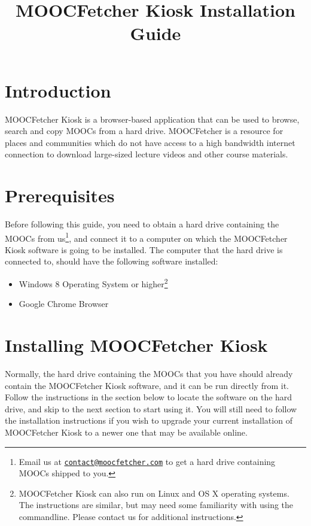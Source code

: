 \documentclass[]{article}
\title{MOOCFetcher Kiosk Installation Guide}
\date{}
\providecommand{\tightlist}{%
  \setlength{\itemsep}{0pt}\setlength{\parskip}{0pt}}
\begin{document}
\maketitle

\section{Introduction}\label{introduction}

MOOCFetcher Kiosk is a browser-based application that can be used to
browse, search and copy MOOCs from a hard drive. MOOCFetcher is a
resource for places and communities which do not have access to a high
bandwidth internet connection to download large-sized lecture videos and
other course materials.

\section{Prerequisites}\label{prerequisites}

Before following this guide, you need to obtain a hard drive containing
the MOOCs from us\footnote{Email us at
  \href{mailto:contact@moocfetcher.com}{\nolinkurl{contact@moocfetcher.com}}
  to get a hard drive containing MOOCs shipped to you.}, and connect it
to a computer on which the MOOCFetcher Kiosk software is going to be
installed. The computer that the hard drive is connected to, should have
the following software installed:

\begin{itemize}
\tightlist
\item
  Windows 8 Operating System or higher\footnote{MOOCFetcher Kiosk can
    also run on Linux and OS X operating systems. The instructions are
    similar, but may need some familiarity with using the commandline.
    Please contact us for additional instructions.}
\item
  Google Chrome Browser
\end{itemize}

\section{Installing MOOCFetcher
Kiosk}\label{installing-moocfetcher-kiosk}

Normally, the hard drive containing the MOOCs that you have should
already contain the MOOCFetcher Kiosk software, and it can be run
directly from it. Follow the instructions in the section below to locate
the software on the hard drive, and skip to the next section to start
using it. You will still need to follow the installation instructions if
you wish to upgrade your current installation of MOOCFetcher Kiosk to a
newer one that may be available online.
\end{document}
